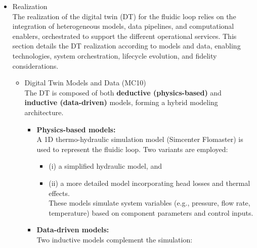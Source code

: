 \documentclass[
]{article}
\providecommand{\tightlist}{%
  \setlength{\itemsep}{0pt}\setlength{\parskip}{0pt}}
\begin{document}
\begin{itemize}
\begin{itemize}
\begin{itemize}
      \begin{itemize}
      \tightlist
      \item
        Cavitation detection,
      \item
        \textbf{Virtual sensing}, where flow rate can be estimated in
        case of sensor failure,
      \item
        \textbf{Energy consumption analysis}, through simulation of
        alternative cooling strategies,
      \item
        \textbf{Divergence detection}, identifying discrepancies between
        the physical and virtual systems to trigger recalibration.
      \end{itemize}
    \item
      Realization\\
      The realization of the digital twin (DT) for the fluidic loop
      relies on the integration of heterogeneous models, data pipelines,
      and computational enablers, orchestrated to support the different
      operational services. This section details the DT realization
      according to models and data, enabling technologies, system
      orchestration, lifecycle evolution, and fidelity considerations.

      \begin{itemize}
      \item
        Digital Twin Models and Data (MC10)\\
        The DT is composed of both \textbf{deductive (physics-based)}
        and \textbf{inductive (data-driven)} models, forming a hybrid
        modeling architecture.

        \begin{itemize}
        \tightlist
        \item
          \textbf{Physics-based models:}\\
          A 1D thermo-hydraulic simulation model (Simcenter Flomaster)
          is used to represent the fluidic loop. Two variants are
          employed:

          \begin{itemize}
          \tightlist
          \item
            (i) a simplified hydraulic model, and
          \item
            (ii) a more detailed model incorporating head losses and
            thermal effects.\\
            These models simulate system variables (e.g., pressure, flow
            rate, temperature) based on component parameters and control
            inputs.
          \end{itemize}
        \item
          \textbf{Data-driven models:}\\
          Two inductive models complement the simulation:


\end{itemize}
\end{itemize}
\end{itemize}
\end{itemize}
\end{itemize}
\end{document}
